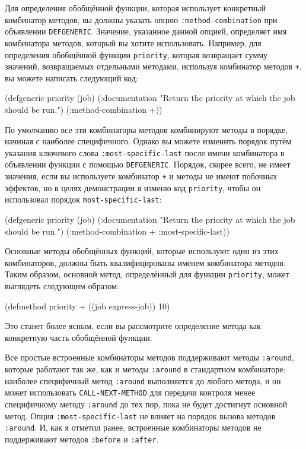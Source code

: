 Для определения обобщённой функции, которая использует конкретный комбинатор методов, вы
должны указать опцию \lstinline{:method-combination} при объявлении \lstinline{DEFGENERIC}.
Значение, указанное данной опцией, определяет имя комбинатора методов, который вы хотите
использовать.  Например, для определения обобщённой функции \lstinline{priority}, которая
возвращает сумму значений, возвращаемых отдельными методами, используя комбинатор методов
\lstinline{+}, вы можете написать следующий код:

\begin{myverb}
(defgeneric priority (job)
  (:documentation "Return the priority at which the job should be run.")
  (:method-combination +))
\end{myverb}

По умолчанию все эти комбинаторы методов комбинируют методы в порядке, начиная с наиболее
специфичного.  Однако вы можете изменить порядок путём указания ключевого слова
\lstinline{:most-specific-last} после имени комбинатора в объявлении функции с помощью
\lstinline{DEFGENERIC}.  Порядок, скорее всего, не имеет значения, если вы используете комбинатор
\lstinline{+} и методы не имеют побочных эффектов, но в целях демонстрации я изменю код
\lstinline{priority}, чтобы он использовал порядок \lstinline{most-specific-last}:

\begin{myverb}
(defgeneric priority (job)
  (:documentation "Return the priority at which the job should be run.")
  (:method-combination + :most-specific-last))
\end{myverb}

Основные методы обобщённых функций, которые используют один из этих комбинаторов, должны
быть квалифицированы именем комбинатора методов.  Таким образом, основной метод,
определённый для функции \lstinline{priority}, может выглядеть следующим образом:

\begin{myverb}
(defmethod priority + ((job express-job)) 10)
\end{myverb}

Это станет более ясным, если вы рассмотрите определение метода как конкретную часть
обобщённой функции.

Все простые встроенные комбинаторы методов поддерживают методы \lstinline{:around}, которые
работают так же, как и методы \lstinline{:around} в стандартном комбинаторе: наиболее специфичный
метод \lstinline{:around} выполняется до любого метода, и он может использовать
\lstinline{CALL-NEXT-METHOD} для передачи контроля менее специфичному методу \lstinline{:around} до
тех пор, пока не будет достигнут основной метод.  Опция \lstinline{:most-specific-last} не
влияет на порядок вызова методов \lstinline{:around}.  И, как я отметил ранее, встроенные
комбинаторы методов не поддерживают методов \lstinline{:before} и \lstinline{:after}.

